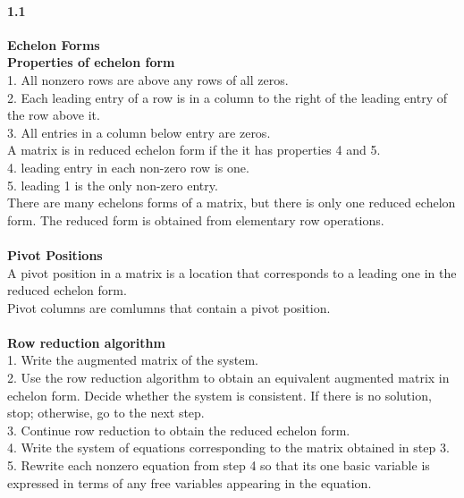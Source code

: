 \documentclass[14pt]{extreport}
\begin{document}
\paragraph{1.1}\textbf{Echelon Forms}\\

\textbf{Properties of echelon form}\\
1. All nonzero rows are above any rows of all zeros.\\
2. Each leading entry of a row is in a column to the right of the leading entry of the row above it.\\
3. All entries in a column below entry are zeros.\\
A matrix is in reduced echelon form if the it has properties 4 and 5.\\
4. leading entry in each non-zero row is one.\\
5. leading 1 is the only non-zero entry.\\

There are many echelons forms of a matrix, but there is only one reduced echelon form. The reduced form is obtained from elementary row operations.\\\\

\textbf{Pivot Positions}\\

A pivot position in a matrix is a location that corresponds to a leading one in the reduced echelon form.\\

Pivot columns are comlumns that contain a pivot position.\\\\

\textbf{Row reduction algorithm}\\
1. Write the augmented matrix of the system.\\
2. Use the row reduction algorithm to obtain an equivalent augmented matrix in\\
echelon form. Decide whether the system is consistent. If there is no solution,
stop; otherwise, go to the next step.\\
3. Continue row reduction to obtain the reduced echelon form.\\
4. Write the system of equations corresponding to the matrix obtained in step 3.\\
5. Rewrite each nonzero equation from step 4 so that its one basic variable is expressed in terms of any free variables appearing in the equation.\\
\end{document}
